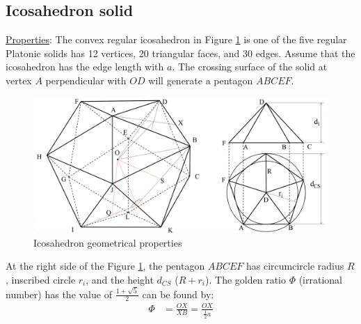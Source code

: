 \clearpage
\newpage
\subsection{Icosahedron solid}
\noindent\uline{Properties}:
The convex regular icosahedron in Figure \ref{fig:icosaGeo2} is one of the five regular Platonic solids has 12 vertices, 20 triangular faces, and 30 edges. 
Assume that the icosahedron has the edge length with $a$. 
The crossing surface of the solid at vertex $A$ perpendicular with $OD$ will generate a pentagon $ABCEF$.

\begin{figure}[h]
\centering
	\includegraphics[width=\textwidth]{image/icosaGeo22.png}
%	
	\caption{Icosahedron geometrical properties}
	\label{fig:icosaGeo2}
\end{figure}

\noindent At the right side of  the Figure \ref{fig:icosaGeo2}, the pentagon $ABCEF$ has circumcircle radius $R$, inscribed circle $r_i$, and the height $d_{CS}$ ($R+r_i$).
The golden ratio $\Phi$ (irrational number) has the value of $\frac{1+\sqrt{5}}{2}$ can be found by:
\begin{equation*} 
\label{icosa:eq1}
\begin{split}
\Phi & = \frac{OX}{XB} = \frac{OX}{\frac{1}{2}a}\\
\end{split}
\end{equation*}


